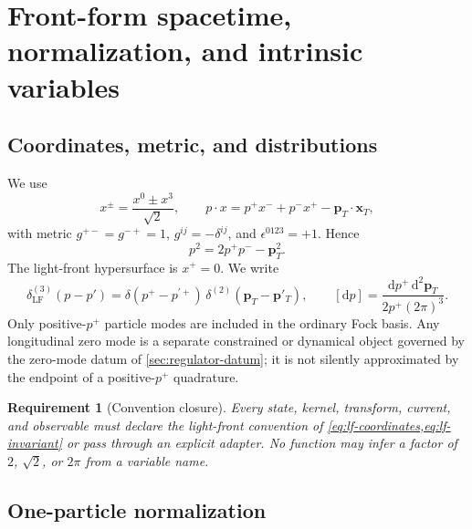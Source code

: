 \documentclass[11pt]{article}
\newtheorem{requirement}[definition]{Requirement}
\newcommand{\dd}{\mathrm{d}}
\newcommand{\LF}{\mathrm{LF}}
\begin{document}
\section{Front-form spacetime, normalization, and intrinsic variables}
\label{sec:front-form}

\subsection{Coordinates, metric, and distributions}

We use
\begin{equation}
 x^{\pm}=\frac{x^0\pm x^3}{\sqrt2},
 \qquad
 p\cdot x=p^+x^-+p^-x^+-\bm p_T\cdot\bm x_T,
\label{eq:lf-coordinates}
\end{equation}
with metric \(g^{+-}=g^{-+}=1\), \(g^{ij}=-\delta^{ij}\), and
\(\epsilon^{0123}=+1\).  Hence
\begin{equation}
 p^2=2p^+p^- -\bm p_T^2.
\label{eq:lf-invariant}
\end{equation}
The light-front hypersurface is \(x^+=0\).  We write
\begin{equation}
 \delta^{(3)}_{\LF}(p-p')
 =\delta(p^+-p^{\prime +})\,
  \delta^{(2)}(\bm p_T-\bm p'_T),
\qquad
 [\dd p]=\frac{\dd p^+\,\dd^2\bm p_T}
 {2p^+(2\pi)^3}.
\label{eq:lf-measure}
\end{equation}
Only positive-\(p^+\) particle modes are included in the ordinary Fock
basis.  Any longitudinal zero mode is a separate constrained or dynamical
object governed by the zero-mode datum of \cref{sec:regulator-datum}; it is
not silently approximated by the endpoint of a positive-\(p^+\) quadrature.

\begin{requirement}[Convention closure]
\label{req:convention-closure}
Every state, kernel, transform, current, and observable must declare the
light-front convention of \cref{eq:lf-coordinates,eq:lf-invariant} or pass
through an explicit adapter.  No function may infer a factor of \(2\),
\(\sqrt2\), or \(2\pi\) from a variable name.
\end{requirement}

\subsection{One-particle normalization}
\end{document}
